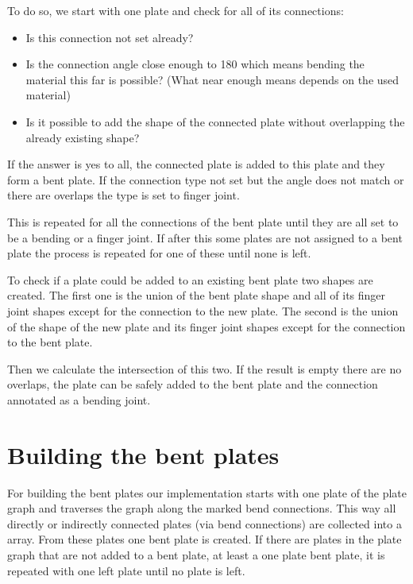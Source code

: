 \documentclass[../ClassicThesis.tex]{subfiles}
\begin{document}
To do so, we start with one plate and check for all of its connections:
\begin{itemize}
\item Is this connection not set already?
\item Is the connection angle close enough to 180\textdegree{} which means bending the material this far is possible? (What near enough means depends on the used material)
\item Is it possible to add the shape of the connected plate without overlapping the already existing shape?
\end{itemize}
If the answer is yes to all, the connected plate is added to this plate and they form a bent plate. If the connection type not set but the angle does not match or there are overlaps the type is set to finger joint.

This is repeated for all the connections of the bent plate until they are all set to be a bending or a finger joint. If after this some plates are not assigned to a bent plate the process is repeated for one of these until none is left.

To check if a plate could be added to an existing bent plate two shapes are created. The first one is the union of the bent plate shape and all of its finger joint shapes except for the connection to the new plate. The second is the union of the shape of the new plate and its finger joint shapes except for the connection to the bent plate.

Then we calculate the intersection of this two. If the result is empty there are no overlaps, the plate can be safely added to the bent plate and the connection annotated as a bending joint.


\section{Building the bent plates}
For building the bent plates our implementation starts with one plate of the plate graph and traverses the graph along the marked bend connections. This way all directly or indirectly connected plates (via bend connections) are collected into a array. From these plates one bent plate is created. If there are plates in the plate graph that are not added to a bent plate, at least a one plate bent plate, it is repeated with one left plate until no plate is left.
\end{document}
